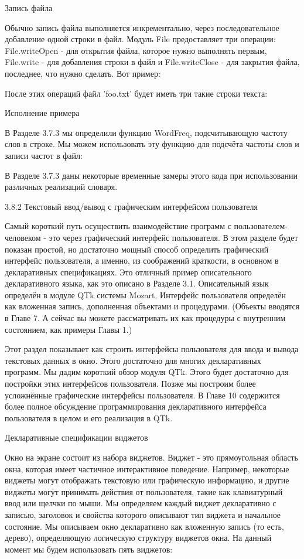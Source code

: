 Запись файла

Обычно запись файла выполняется инкрементально, через последовательное добавление одной строки в файл. Модуль File предоставляет три операции: File.writeOpen - для открытия файла, которое нужно выполнять первым, File.write - для добавления строки в файл и File.writeClose - для закрытия файла, последнее, что нужно сделать. Вот пример:

После этих операций файл 'foo.txt' будет иметь три такие строки текста:

Исполнение примера

В Разделе 3.7.3 мы определили функцию WordFreq, подсчитывающую частоту слов в строке. Мы можем использовать эту функцию для подсчёта частоты слов и записи частот в файл:

В Разделе 3.7.3 даны некоторые временные замеры этого кода при использовании различных реализаций словаря.

3.8.2 Текстовый ввод/вывод с графическим интерфейсом пользователя

Самый короткий путь осуществить взаимодействие программ с пользователем-человеком - это через графический интерфейс пользователя. В этом разделе будет показан простой, но достаточно мощный способ определить графический интерфейс пользователя, а именно, из соображений краткости, в основном в декларативных спецификациях. Это отличный пример описательного декларативного языка, как это описано в Разделе 3.1. Описательный язык определён в модуле QTk системы Mozart. Интерфейс пользователя определён как вложенная запись, дополненная объектами и процедурами. (Объекты вводятся в Главе 7. А сейчас вы можете рассматривать их как процедуры с внутренним состоянием, как примеры Главы 1.)

Этот раздел показывает как строить интерфейсы пользователя для ввода и вывода текстовых данных в окно. Этого достаточно для многих декларативных программ. Мы дадим короткий обзор модуля QTk. Этого будет достаточно для постройки этих интерфейсов пользователя. Позже мы построим более усложнённые графические интерфейсы пользователя. В Главе 10 содержится более полное обсуждение программирования декларативного интерфейса пользователя в целом и его реализация в QTk.

Декларативные спецификации виджетов

Окно на экране состоит из набора виджетов. Виджет - это прямоугольная область окна, которая имеет частичное интерактивное поведение. Например, некоторые виджеты могут отображать текстовую или графическую информацию, и другие виджеты могут принимать действия от пользователя, такие как клавиатурный ввод или щелчки по мыши. Мы определяем каждый виджет декларативно с записью, заголовок и свойства которого описывают тип виджета и начальное состояние. Мы описываем окно декларативно как вложенную запись (то есть, дерево), определяющую логическую структуру виджетов окна. На данный момент мы будем использовать пять виджетов:

